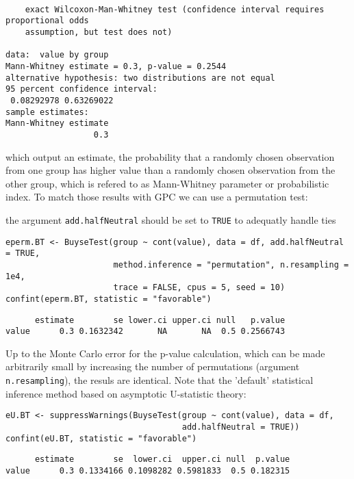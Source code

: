 \documentclass[12pt]{article}
\newcommand\Warning[1][3ex]{%
\renewcommand\stacktype{L}%
\scaleto{\stackon[1.3pt]{\color{red}$\triangle$}{\tiny\bfseries !}}{#1}%
\xspace
}
\begin{document}
\begin{verbatim}

	exact Wilcoxon-Man-Whitney test (confidence interval requires proportional odds
	assumption, but test does not)

data:  value by group
Mann-Whitney estimate = 0.3, p-value = 0.2544
alternative hypothesis: two distributions are not equal
95 percent confidence interval:
 0.08292978 0.63269022
sample estimates:
Mann-Whitney estimate 
                  0.3
\end{verbatim}

\noindent which output an estimate, the probability that a randomly
chosen observation from one group has higher value than a randomly
chosen observation from the other group, which is refered to as
Mann-Whitney parameter or probabilistic index. To match those results
with GPC we can use a permutation test: \newline \Warning the argument
\texttt{add.halfNeutral} should be set to \texttt{TRUE} to adequatly handle ties
\lstset{language=r,label= ,caption= ,captionpos=b,numbers=none}
\begin{lstlisting}
eperm.BT <- BuyseTest(group ~ cont(value), data = df, add.halfNeutral = TRUE,
                      method.inference = "permutation", n.resampling = 1e4,
                      trace = FALSE, cpus = 5, seed = 10)
confint(eperm.BT, statistic = "favorable")
\end{lstlisting}

\begin{verbatim}
      estimate        se lower.ci upper.ci null   p.value
value      0.3 0.1632342       NA       NA  0.5 0.2566743
\end{verbatim}


Up to the Monte Carlo error for the p-value calculation, which can be
made arbitrarily small by increasing the number of permutations
(argument \texttt{n.resampling}), the resuls are identical. Note that the
'default' statistical inference method based on asymptotic
U-statistic theory:
\lstset{language=r,label= ,caption= ,captionpos=b,numbers=none}
\begin{lstlisting}
eU.BT <- suppressWarnings(BuyseTest(group ~ cont(value), data = df,
                                    add.halfNeutral = TRUE))
confint(eU.BT, statistic = "favorable")
\end{lstlisting}

\begin{verbatim}
      estimate        se  lower.ci  upper.ci null  p.value
value      0.3 0.1334166 0.1098282 0.5981833  0.5 0.182315
\end{verbatim}
\end{document}
